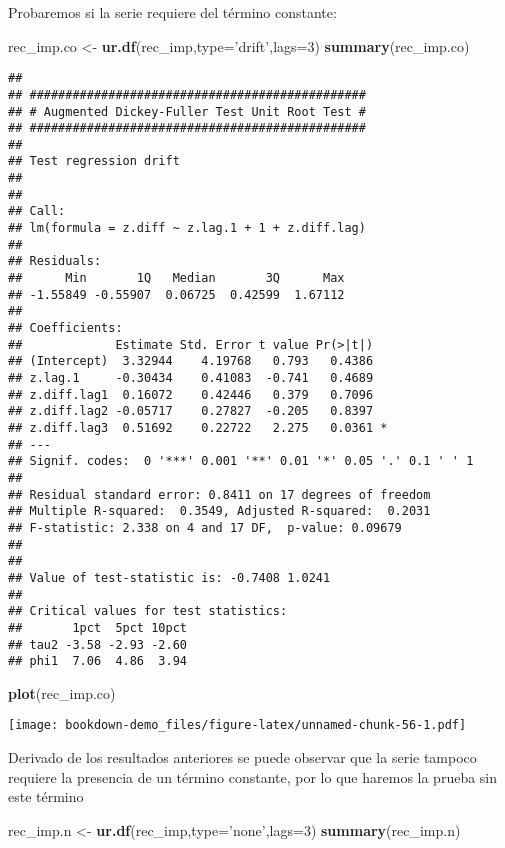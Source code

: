\documentclass[]{book}
\newenvironment{Shaded}{\begin{snugshade}}{\end{snugshade}}
\newcommand{\KeywordTok}[1]{\textcolor[rgb]{0.13,0.29,0.53}{\textbf{#1}}}
\newcommand{\DataTypeTok}[1]{\textcolor[rgb]{0.13,0.29,0.53}{#1}}
\newcommand{\DecValTok}[1]{\textcolor[rgb]{0.00,0.00,0.81}{#1}}
\newcommand{\StringTok}[1]{\textcolor[rgb]{0.31,0.60,0.02}{#1}}
\newcommand{\NormalTok}[1]{#1}
\theoremstyle{definition}
\theoremstyle{definition}
\theoremstyle{definition}
\theoremstyle{remark}
\begin{document}
Probaremos si la serie requiere del término constante:

\begin{Shaded}
\begin{Highlighting}[]
\NormalTok{rec_imp.co <-}\StringTok{ }\KeywordTok{ur.df}\NormalTok{(rec_imp,}\DataTypeTok{type=}\StringTok{'drift'}\NormalTok{,}\DataTypeTok{lags=}\DecValTok{3}\NormalTok{)}
\KeywordTok{summary}\NormalTok{(rec_imp.co)}
\end{Highlighting}
\end{Shaded}

\begin{verbatim}
## 
## ############################################### 
## # Augmented Dickey-Fuller Test Unit Root Test # 
## ############################################### 
## 
## Test regression drift 
## 
## 
## Call:
## lm(formula = z.diff ~ z.lag.1 + 1 + z.diff.lag)
## 
## Residuals:
##      Min       1Q   Median       3Q      Max 
## -1.55849 -0.55907  0.06725  0.42599  1.67112 
## 
## Coefficients:
##             Estimate Std. Error t value Pr(>|t|)  
## (Intercept)  3.32944    4.19768   0.793   0.4386  
## z.lag.1     -0.30434    0.41083  -0.741   0.4689  
## z.diff.lag1  0.16072    0.42446   0.379   0.7096  
## z.diff.lag2 -0.05717    0.27827  -0.205   0.8397  
## z.diff.lag3  0.51692    0.22722   2.275   0.0361 *
## ---
## Signif. codes:  0 '***' 0.001 '**' 0.01 '*' 0.05 '.' 0.1 ' ' 1
## 
## Residual standard error: 0.8411 on 17 degrees of freedom
## Multiple R-squared:  0.3549, Adjusted R-squared:  0.2031 
## F-statistic: 2.338 on 4 and 17 DF,  p-value: 0.09679
## 
## 
## Value of test-statistic is: -0.7408 1.0241 
## 
## Critical values for test statistics: 
##       1pct  5pct 10pct
## tau2 -3.58 -2.93 -2.60
## phi1  7.06  4.86  3.94
\end{verbatim}

\begin{Shaded}
\begin{Highlighting}[]
\KeywordTok{plot}\NormalTok{(rec_imp.co)}
\end{Highlighting}
\end{Shaded}

\texttt{[image: bookdown-demo\_files/figure-latex/unnamed-chunk-56-1.pdf]}

Derivado de los resultados anteriores se puede observar que la serie
tampoco requiere la presencia de un término constante, por lo que
haremos la prueba sin este término

\begin{Shaded}
\begin{Highlighting}[]
\NormalTok{rec_imp.n <-}\StringTok{ }\KeywordTok{ur.df}\NormalTok{(rec_imp,}\DataTypeTok{type=}\StringTok{'none'}\NormalTok{,}\DataTypeTok{lags=}\DecValTok{3}\NormalTok{)}
\KeywordTok{summary}\NormalTok{(rec_imp.n)}
\end{Highlighting}
\end{Shaded}
\end{document}
